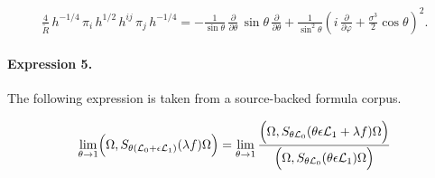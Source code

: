 \documentclass[11pt]{article}
\begin{document}
\begin{align*}\frac{4}{\tilde R} \,h^{-1/4}\,\pi_i\,h^{1/2}\, h^{ij}\,\pi _j\,h^{-1/4}=-\frac{1}{\sin\theta}\,\frac{\partial}{\partial\theta}\,\sin \theta\,\frac{\partial}{\partial\theta}+ \frac{1}{\sin^2 \theta}\left(i\,\frac{\partial}{\partial\varphi} +\frac{\sigma^3}{2} \cos\theta\right)^2 .\end{align*}

\paragraph{Expression 5.} The following expression is taken from a source-backed formula corpus.

\begin{align*}\lim_{\theta\to 1}\Bigl(\Omega,S_{\theta ({\cal L}_0+\epsilon {\cal L}_1)}(\lambda f)\Omega\Bigr)=\lim_{\theta\to 1}\frac{\Bigl(\Omega,S_{\theta {\cal L}_0}(\theta\epsilon {\cal L}_1+\lambda f)\Omega\Bigr)}{\Bigl(\Omega,S_{\theta {\cal L}_0}(\theta\epsilon {\cal L}_1)\Omega\Bigr)}\end{align*}
\end{document}
